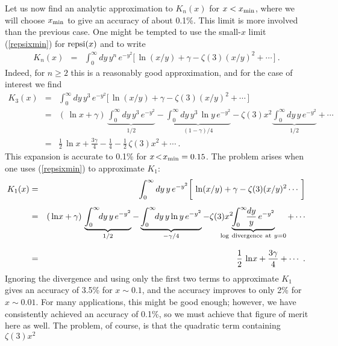 \documentclass[preprint,12pt,eqsecnum,nofootinbib,amsmath,amssymb]{revtex4}
\begin{document}
Let us now find an analytic approximation to $K_n(x)$ for
$x < x_{\rm min}$, where we will choose $x_{\rm min}$ to 
give an accuracy of about 0.1\%. This limit is more involved 
than the previous case. One might be tempted to use the 
small-$x$ limit (\ref{repsixmin}) for ${\rm repsi}(x)$
and to write 
\begin{eqnarray}
  K_n(x) &=& \int_0^\infty dy\, y^n \, e^{-y^2} \bigg[\,
  \ln(x/y) + \gamma - \zeta(3) (x/y)^2 + \cdots \,\bigg] \ .
\end{eqnarray}
Indeed, for $n \ge 2$ this is a reasonably good approximation,
and for the case of interest we find 
\begin{eqnarray}
  K_3(x) &=& 
  \int_0^\infty dy\, y^3 \, e^{-y^2} \bigg[\,
  \ln(x/y) + \gamma - \zeta(3) (x/y)^2 + \cdots \,\bigg]
\\[5pt]
  &=&
  (\,\ln \!x + \gamma) \, 
  \underbrace{\int_0^\infty \!\!dy\, y^3 \, e^{-y^2}}_{1/2} - 
  \underbrace{\int_0^\infty \!\!dy\, y^3 \, \ln y \, 
  e^{-y^2}}_{(1-\gamma)/4} -
  \zeta(3) x^2 \underbrace{\int_0^\infty \!\!dy\, y \, 
  e^{-y^2}}_{1/2}  + \cdots 
\\[8pt]
  &=&
  \frac{1}{2}\,\ln\!x + \frac{3\gamma}{4} - \frac{1}{4} -
  \frac{1}{2}\,\zeta(3) x^2 + \cdots \ .
\end{eqnarray}
This expansion is accurate to 0.1\% for $x \!<\! x_{\rm min}=
0.15$. The problem arises when one uses (\ref{repsixmin})
to approximate $K_1$:
\begin{eqnarray}
  K_1(x) &=& 
  \int_0^\infty dy\, y \, e^{-y^2} \bigg[\,
  \ln(x/y) + \gamma  - \zeta(3)(x/y)^2 \cdots \,\bigg]
\\[5pt]
  &=&
  (\,\ln \!x + \gamma) \, 
  \underbrace{\int_0^\infty \!\!dy\, y \, e^{-y^2}}_{1/2} - 
  \underbrace{\int_0^\infty \!\!dy\, y \ln y \, 
  e^{-y^2}}_{-\gamma/4} - \zeta(3) x^2 \hskip-0.6cm
  \underbrace{\int_0^\infty \!\!\frac{dy}{y} \, 
  e^{-y^2}}_{{\rm log~divergence~at~}y=0} + \cdots 
\\[8pt]
\label{K1first}
  &=&
  \frac{1}{2}\,\ln\!x + \frac{3\gamma}{4} +   \cdots \ .
\end{eqnarray}
Ignoring the divergence and using only the first two terms
to approximate $K_1$ gives an accuracy of 3.5\% for $x \sim
0.1$, and the accuracy improves to only 2\% for $x \sim 0.01$.
For many applications, this might be good enough; however,
we have consistently achieved an accuracy of 0.1\%, so we
must achieve that figure of merit here as well. The problem,
of course, is that the quadratic term containing $\zeta(3) x^2$
\end{document}
